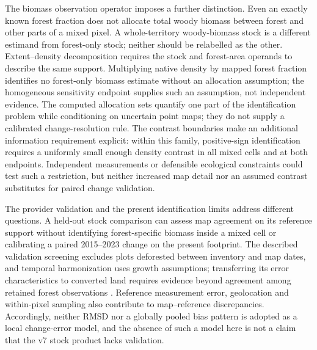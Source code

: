 \documentclass[11pt,a4paper]{article}
\begin{document}
The biomass observation operator imposes a further distinction. Even an exactly known forest fraction does not allocate total woody biomass between forest and other parts of a mixed pixel. A whole-territory woody-biomass stock is a different estimand from forest-only stock; neither should be relabelled as the other. Extent--density decomposition requires the stock and forest-area operands to describe the same support. Multiplying native density by mapped forest fraction identifies no forest-only biomass estimate without an allocation assumption; the homogeneous sensitivity endpoint supplies such an assumption, not independent evidence. The computed allocation sets quantify one part of the identification problem while conditioning on uncertain point maps; they do not supply a calibrated change-resolution rule. The contrast boundaries make an additional information requirement explicit: within this family, positive-sign identification requires a uniformly small enough density contrast in all mixed cells and at both endpoints. Independent measurements or defensible ecological constraints could test such a restriction, but neither increased map detail nor an assumed contrast substitutes for paired change validation.

The provider validation and the present identification limits address different questions. A held-out stock comparison can assess map agreement on its reference support without identifying forest-specific biomass inside a mixed cell or calibrating a paired 2015--2023 change on the present footprint. The described validation screening excludes plots deforested between inventory and map dates, and temporal harmonization uses growth assumptions; transferring its error characteristics to converted land requires evidence beyond agreement among retained forest observations \citep[pp.~13, 18--19]{PVIR2026}. Reference measurement error, geolocation and within-pixel sampling also contribute to map--reference discrepancies. Accordingly, neither RMSD nor a globally pooled bias pattern is adopted as a local change-error model, and the absence of such a model here is not a claim that the v7 stock product lacks validation.
\end{document}
